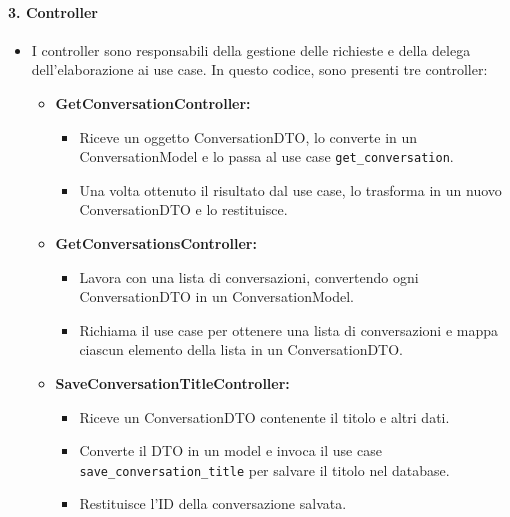     \paragraph{3. Controller}
    \begin{itemize}
        \item I controller sono responsabili della gestione delle richieste e della delega dell'elaborazione ai use case. In questo codice, sono presenti tre controller:
        \begin{itemize}
            \item \textbf{GetConversationController:}
            \begin{itemize}
                \item Riceve un oggetto ConversationDTO, lo converte in un ConversationModel e lo passa al use case \texttt{get\_conversation}.
                \item Una volta ottenuto il risultato dal use case, lo trasforma in un nuovo ConversationDTO e lo restituisce.
            \end{itemize}
            \item \textbf{GetConversationsController:}
            \begin{itemize}
                \item Lavora con una lista di conversazioni, convertendo ogni ConversationDTO in un ConversationModel.
                \item Richiama il use case per ottenere una lista di conversazioni e mappa ciascun elemento della lista in un ConversationDTO.
            \end{itemize}
            \item \textbf{SaveConversationTitleController:}
            \begin{itemize}
                \item Riceve un ConversationDTO contenente il titolo e altri dati.
                \item Converte il DTO in un model e invoca il use case \texttt{save\_conversation\_title} per salvare il titolo nel database.
                \item Restituisce l'ID della conversazione salvata.
            \end{itemize}
        \end{itemize}
    \end{itemize}

